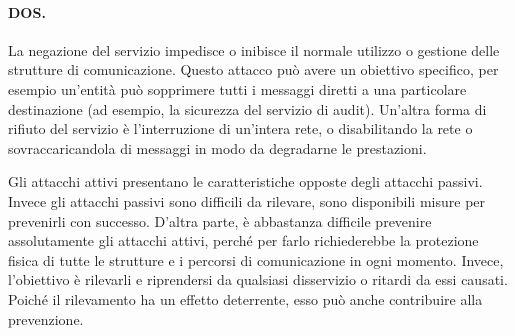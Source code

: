 \paragraph{DOS.} La negazione del servizio impedisce o inibisce il normale utilizzo o gestione delle strutture di comunicazione. Questo attacco può avere un obiettivo specifico, per esempio un'entità può sopprimere tutti i messaggi diretti a una particolare destinazione (ad esempio, la sicurezza del servizio di audit). Un'altra forma di rifiuto del servizio è l'interruzione di un'intera rete, o disabilitando la rete o sovraccaricandola di messaggi in modo da degradarne le prestazioni.

Gli attacchi attivi presentano le caratteristiche opposte degli attacchi passivi. Invece gli attacchi passivi sono difficili da rilevare, sono disponibili misure per prevenirli con successo. D'altra parte, è abbastanza difficile prevenire assolutamente gli attacchi attivi, perché per farlo richiederebbe la protezione fisica di tutte le strutture e i percorsi di comunicazione in ogni momento. Invece, l'obiettivo è rilevarli e riprendersi da qualsiasi disservizio o ritardi da essi causati. Poiché il rilevamento ha un effetto deterrente, esso può anche contribuire alla prevenzione.

